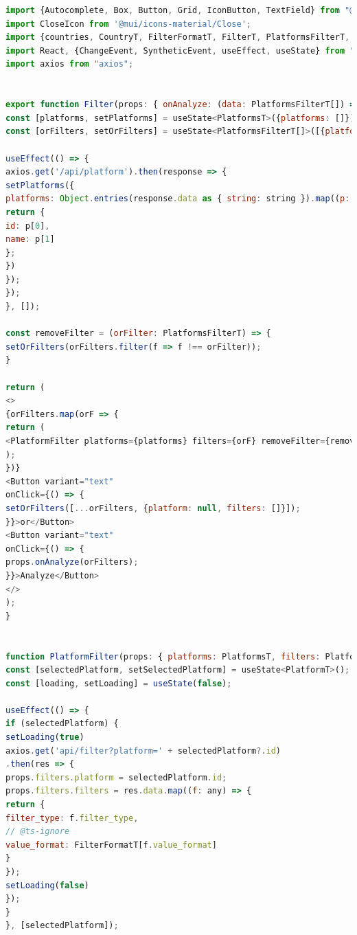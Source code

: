 \documentclass{article}
\begin{document}
\begin{lstlisting}[language=JavaScript, caption=src.components.filter.filter]
import {Autocomplete, Box, Button, Grid, IconButton, TextField} from "@mui/material";
import CloseIcon from '@mui/icons-material/Close';
import {countries, CountryT, FilterFormatT, FilterT, PlatformsFilterT, PlatformsT, PlatformT} from "../../types/types";
import React, {ChangeEvent, SyntheticEvent, useEffect, useState} from "react";
import axios from "axios";


export function Filter(props: { onAnalyze: (data: PlatformsFilterT[]) => void }) {
const [platforms, setPlatforms] = useState<PlatformsT>({platforms: []});
const [orFilters, setOrFilters] = useState<PlatformsFilterT[]>([{platform: null, filters: []}]);

useEffect(() => {
axios.get('/api/platform').then(response => {
setPlatforms({
platforms: Object.entries(response.data as { string: string }).map((p: [string, string], i: number) => {
return {
id: p[0],
name: p[1]
};
})
});
});
}, []);

const removeFilter = (orFilter: PlatformsFilterT) => {
setOrFilters(orFilters.filter(f => f !== orFilter));
}

return (
<>
{orFilters.map(orF => {
return (
<PlatformFilter platforms={platforms} filters={orF} removeFilter={removeFilter}/>
);
})}
<Button variant="text"
onClick={() => {
setOrFilters([...orFilters, {platform: null, filters: []}]);
}}>or</Button>
<Button variant="text"
onClick={() => {
props.onAnalyze(orFilters);
}}>Analyze</Button>
</>
);
}


function PlatformFilter(props: { platforms: PlatformsT, filters: PlatformsFilterT, removeFilter: (orFilter: PlatformsFilterT) => void }) {
const [selectedPlatform, setSelectedPlatform] = useState<PlatformT>();
const [loading, setLoading] = useState(false);

useEffect(() => {
if (selectedPlatform) {
setLoading(true)
axios.get('api/filter?platform=' + selectedPlatform?.id)
.then(res => {
props.filters.platform = selectedPlatform.id;
props.filters.filters = res.data.map((f: any) => {
return {
filter_type: f.filter_type,
// @ts-ignore
value_format: FilterFormatT[f.value_format]
}
});
setLoading(false)
});
}
}, [selectedPlatform]);


\end{lstlisting}
\end{document}
